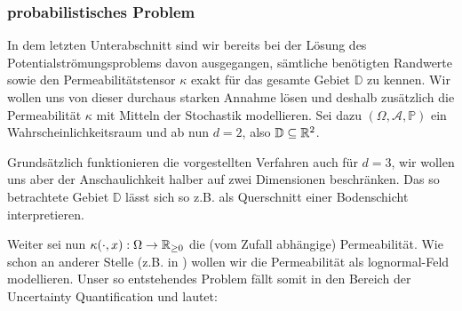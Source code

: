 \subsubsection{probabilistisches Problem}
In dem letzten Unterabschnitt sind wir bereits bei der Lösung des Potentialströmungsproblems davon ausgegangen, sämtliche benötigten Randwerte sowie den Permeabilitätstensor $\kappa$ exakt für das gesamte Gebiet $\mathbb{D}$ zu kennen.
Wir wollen uns von dieser durchaus starken Annahme lösen und deshalb zusätzlich die Permeabilität $\kappa$ mit Mitteln der Stochastik modellieren.
Sei dazu $(\Omega, \mathcal{A},\mathbb{P})$ ein Wahrscheinlichkeitsraum und ab nun $d=2$, also $\mathbb{D} \subseteq \mathbb{R}^2$.
\begin{Bemerkung}
	Grundsätzlich funktionieren die vorgestellten Verfahren auch für $d=3$, wir wollen uns aber der Anschaulichkeit halber auf zwei Dimensionen beschränken. Das so betrachtete Gebiet $\mathbb{D}$ lässt sich so z.B. als Querschnitt einer Bodenschicht interpretieren.
\end{Bemerkung} 
Weiter sei nun $\kappa (\cdot,x): \Omega \rightarrow \mathbb{R}_{\geq0}$ die (vom Zufall abhängige) Permeabilität.
Wie schon an anderer Stelle (z.B. in \cite{kumar2018multigrid}) wollen wir die Permeabilität als lognormal-Feld modellieren.
Unser so entstehendes Problem fällt somit in den Bereich der Uncertainty Quantification und lautet: 


